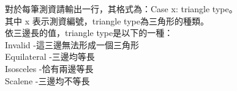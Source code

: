 對於每筆測資請輸出一行，其格式為：Case {x}: {triangle type}。\\
其中 x 表示測資編號，{triangle type}為三角形的種類。\\
依三邊長的值，{triangle type}是以下的一種：\\
Invalid -這三邊無法形成一個三角形\\
Equilateral -三邊均等長\\
Isosceles -恰有兩邊等長\\
Scalene -三邊均不等長\\